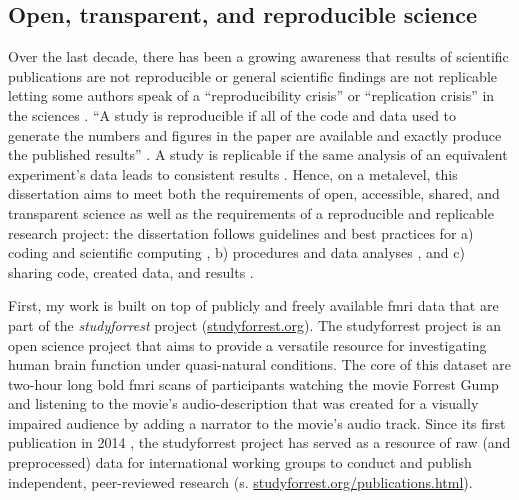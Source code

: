 \subsection{Open, transparent, and reproducible science}

Over the last decade, there has been a growing awareness that results of
scientific publications are not reproducible or general scientific findings are
not replicable letting some authors speak of a ``reproducibility crisis'' or
``replication crisis'' in the sciences \citep{baker2016reproducibility,
plesser2018reproducibility, stupple2019reproducibility, nosek2022replicability}.
``A study is reproducible if all of the code and data used to generate the
numbers and figures in the paper are available and exactly produce the published
results'' \citep{leek2017most}.
A study is replicable if the same analysis of an equivalent experiment's data
leads to consistent results \citep{dubois2016building, leek2017most}.
%
Hence, on a metalevel, this dissertation aims to meet both the requirements of
open, accessible, shared, and transparent science \citep{watson2015will,
fecher2014open} as well as the requirements of a reproducible and replicable
research project:
%
the dissertation follows guidelines and best practices for a) coding and
scientific computing \citep{wilson2014best}, b) procedures and data analyses
\citep{nichols2017best, poldrack2017scanning, poldrack2019establishment}, and c)
sharing code, created data, and results \citep{eglen2017toward, nichols2017best,
pernet2015improving}.



First, my work is built on top of publicly and freely available \ac{fmri} data
that are part of the \textit{studyforrest} project
(\href{www.studyforrest.org}{\url{studyforrest.org}}).
%
The studyforrest project is an open science project that aims to provide a
versatile resource for investigating human brain function under quasi-natural
conditions.
The core of this dataset are two-hour long \ac{bold} \ac{fmri} scans of
participants watching the movie Forrest Gump \citep{ForrestGumpMovie} and
listening to the movie's audio-description that was created for a visually
impaired audience by adding a narrator to the movie's audio track.
Since its first publication in 2014 \citep{hanke2014audiomovie}, the
studyforrest project has served as a resource of raw (and preprocessed) data for
international working groups to conduct and publish independent, peer-reviewed
research (s.
\href{www.studyforrest.org/publications.html}{\url{studyforrest.org/publications.html}}).

